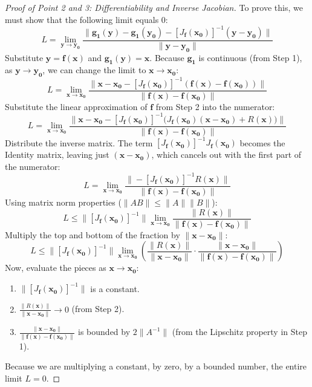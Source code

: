 \documentclass{article}
\begin{document}
\begin{proof}[Proof of Point 2 and 3: Differentiability and Inverse Jacobian]
To prove this, we must show that the following limit equals $0$:
\[
    L = \lim_{\mathbf{y} \to \mathbf{y_0}} \frac{\|\mathbf{g_1}(\mathbf{y}) - \mathbf{g_1}(\mathbf{y_0}) - [J_{\mathbf{f}}(\mathbf{x_0})]^{-1}(\mathbf{y} - \mathbf{y_0})\|}{\|\mathbf{y} - \mathbf{y_0}\|}
\]
Substitute $\mathbf{y} = \mathbf{f}(\mathbf{x})$ and $\mathbf{g_1}(\mathbf{y}) = \mathbf{x}$. Because $\mathbf{g_1}$ is continuous (from Step 1), as $\mathbf{y} \to \mathbf{y_0}$, we can change the limit to $\mathbf{x} \to \mathbf{x_0}$:
\[
    L = \lim_{\mathbf{x} \to \mathbf{x_0}} \frac{\|\mathbf{x} - \mathbf{x_0} - [J_{\mathbf{f}}(\mathbf{x_0})]^{-1}(\mathbf{f}(\mathbf{x}) - \mathbf{f}(\mathbf{x_0}))\|}{\|\mathbf{f}(\mathbf{x}) - \mathbf{f}(\mathbf{x_0})\|}
\]
Substitute the linear approximation of $\mathbf{f}$ from Step 2 into the numerator:
\[
    L = \lim_{\mathbf{x} \to \mathbf{x_0}} \frac{\|\mathbf{x} - \mathbf{x_0} - [J_{\mathbf{f}}(\mathbf{x_0})]^{-1} \big( J_{\mathbf{f}}(\mathbf{x_0})(\mathbf{x} - \mathbf{x_0}) + R(\mathbf{x}) \big) \|}{\|\mathbf{f}(\mathbf{x}) - \mathbf{f}(\mathbf{x_0})\|}
\]
Distribute the inverse matrix. The term $[J_{\mathbf{f}}(\mathbf{x_0})]^{-1} J_{\mathbf{f}}(\mathbf{x_0})$ becomes the Identity matrix, leaving just $(\mathbf{x} - \mathbf{x_0})$, which cancels out with the first part of the numerator:
\[
    L = \lim_{\mathbf{x} \to \mathbf{x_0}} \frac{\|- [J_{\mathbf{f}}(\mathbf{x_0})]^{-1} R(\mathbf{x})\|}{\|\mathbf{f}(\mathbf{x}) - \mathbf{f}(\mathbf{x_0})\|}
\]
Using matrix norm properties ($\|AB\| \leq \|A\|\|B\|$):
\[
    L \leq \|[J_{\mathbf{f}}(\mathbf{x_0})]^{-1}\| \lim_{\mathbf{x} \to \mathbf{x_0}} \frac{\|R(\mathbf{x})\|}{\|\mathbf{f}(\mathbf{x}) - \mathbf{f}(\mathbf{x_0})\|}
\]
Multiply the top and bottom of the fraction by $\|\mathbf{x} - \mathbf{x_0}\|$:
\[
    L \leq \|[J_{\mathbf{f}}(\mathbf{x_0})]^{-1}\| \lim_{\mathbf{x} \to \mathbf{x_0}} \left( \frac{\|R(\mathbf{x})\|}{\|\mathbf{x} - \mathbf{x_0}\|} \cdot \frac{\|\mathbf{x} - \mathbf{x_0}\|}{\|\mathbf{f}(\mathbf{x}) - \mathbf{f}(\mathbf{x_0})\|} \right)
\]
Now, evaluate the pieces as $\mathbf{x} \to \mathbf{x_0}$:
\begin{enumerate}
    \item $\|[J_{\mathbf{f}}(\mathbf{x_0})]^{-1}\|$ is a constant.
    \item $\frac{\|R(\mathbf{x})\|}{\|\mathbf{x} - \mathbf{x_0}\|} \to 0$ (from Step 2).
    \item $\frac{\|\mathbf{x} - \mathbf{x_0}\|}{\|\mathbf{f}(\mathbf{x}) - \mathbf{f}(\mathbf{x_0})\|}$ is bounded by $2\|A^{-1}\|$ (from the Lipschitz property in Step 1).
\end{enumerate}
Because we are multiplying a constant, by zero, by a bounded number, the entire limit $L = 0$.


\end{proof}
\end{document}
